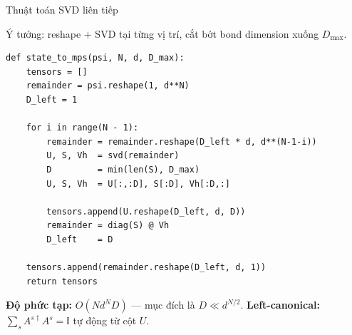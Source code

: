 \documentclass[aspectratio=169, 11pt]{beamer}
\begin{document}
\begin{frame}[fragile, shrink=3]{Thuật toán SVD liên tiếp}

{\small Ý tưởng: reshape + SVD tại từng vị trí, cắt bớt bond dimension xuống $D_{\max}$.}

\vspace{4pt}
\begin{lstlisting}
def state_to_mps(psi, N, d, D_max):
    tensors = []
    remainder = psi.reshape(1, d**N)
    D_left = 1

    for i in range(N - 1):
        remainder = remainder.reshape(D_left * d, d**(N-1-i))
        U, S, Vh  = svd(remainder)
        D         = min(len(S), D_max)
        U, S, Vh  = U[:,:D], S[:D], Vh[:D,:]

        tensors.append(U.reshape(D_left, d, D))
        remainder = diag(S) @ Vh
        D_left    = D

    tensors.append(remainder.reshape(D_left, d, 1))
    return tensors
\end{lstlisting}

\vspace{4pt}
{\small\textcolor{dimtext}{%
\textbf{Độ phức tạp:} $O(N d^N D)$ — mục đích là $D \ll d^{N/2}$.
\quad\textbf{Left-canonical:} $\sum_s A^{s\dagger}A^s = \mathbb{I}$ tự động từ cột $U$.}}

\end{frame}
\end{document}
